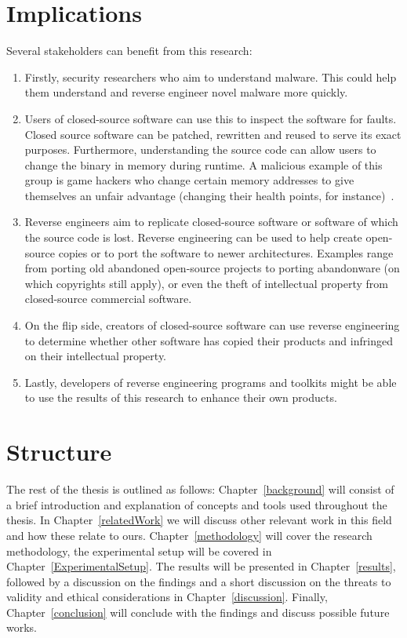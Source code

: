 \section{Implications}
Several stakeholders can benefit from this research:
\begin{enumerate}
    \item Firstly, security researchers who aim to understand malware. This could help them understand and reverse engineer novel malware more quickly.
    \item Users of closed-source software can use this to inspect the software for faults. Closed source software can be patched, rewritten and reused to serve its exact purposes. Furthermore, understanding the source code can allow users to change the binary in memory during runtime. A malicious example of this group is game hackers who change certain memory addresses to give themselves an unfair advantage (changing their health points, for instance)~\cite{TypeInferenceSurvey}. 
    \item Reverse engineers aim to replicate closed-source software or software of which the source code is lost. Reverse engineering can be used to help create open-source copies or to port the software to newer architectures. Examples range from porting old abandoned open-source projects to porting abandonware (on which copyrights still apply), or even the theft of intellectual property from closed-source commercial software.
    \item On the flip side, creators of closed-source software can use reverse engineering to determine whether other software has copied their products and infringed on their intellectual property.
    \item Lastly, developers of reverse engineering programs and toolkits might be able to use the results of this research to enhance their own products. 
\end{enumerate}

\section{Structure}
The rest of the thesis is outlined as follows: Chapter~\ref{background} will consist of a brief introduction and explanation of concepts and tools used throughout the thesis. In Chapter~\ref{relatedWork} we will discuss other relevant work in this field and how these relate to ours. Chapter~\ref{methodology} will cover the research methodology, the experimental setup will be covered in Chapter~\ref{ExperimentalSetup}. The results will be presented in Chapter~\ref{results}, followed by a discussion on the findings and a short discussion on the threats to validity and ethical considerations in Chapter~\ref{discussion}. Finally, Chapter~\ref{conclusion} will conclude with the findings and discuss possible future works.

